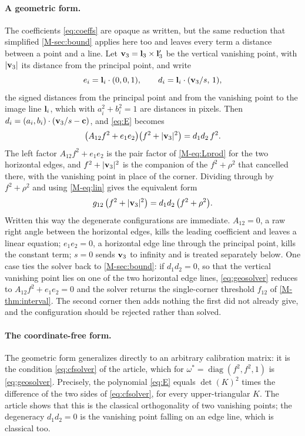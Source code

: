 \paragraph{A geometric form.} The coefficients \eqref{eq:coeffs} are opaque as written, but the same reduction that simplified \cref{M-sec:bound} applies here too and leaves every term a distance between a point and a line. Let $\mathbf{v}_3=\mathbf{l}_3\times\mathbf{l}_3'$ be the vertical vanishing point, with $|\mathbf{v}_3|$ its distance from the principal point, and write
\[
e_i=\mathbf{l}_i\cdot(0,0,1),\qquad d_i=\mathbf{l}_i\cdot(\mathbf{v}_3/s,\,1),
\]
the signed distances from the principal point and from the vanishing point to the image line $\mathbf{l}_i$, which with $a_i^2+b_i^2=1$ are distances in pixels. Then $d_i=(a_i,b_i)\cdot(\mathbf{v}_3/s-\mathbf{c})$, and \eqref{eq:E} becomes
\begin{equation}
\bigl(A_{12}f^2+e_1e_2\bigr)\bigl(f^2+|\mathbf{v}_3|^2\bigr)=d_1d_2\,f^2 .
\label{eq:geosolver}
\end{equation}
The left factor $A_{12}f^2+e_1e_2$ is the pair factor of \eqref{M-eq:Lprod} for the two horizontal edges, and $f^2+|\mathbf{v}_3|^2$ is the companion of the $f^2+\rho^2$ that cancelled there, with the vanishing point in place of the corner. Dividing through by $f^2+\rho^2$ and using \eqref{M-eq:lin} gives the equivalent form
\begin{equation}
g_{12}\,\bigl(f^2+|\mathbf{v}_3|^2\bigr)=d_1d_2\,\bigl(f^2+\rho^2\bigr).
\label{eq:geosolver2}
\end{equation}
Written this way the degenerate configurations are immediate. $A_{12}=0$, a raw right angle between the horizontal edges, kills the leading coefficient and leaves a linear equation; $e_1e_2=0$, a horizontal edge line through the principal point, kills the constant term; $s=0$ sends $\mathbf{v}_3$ to infinity and is treated separately below. One case ties the solver back to \cref{M-sec:bound}: if $d_1d_2=0$, so that the vertical vanishing point lies on one of the two horizontal edge lines, \eqref{eq:geosolver} reduces to $A_{12}f^2+e_1e_2=0$ and the solver returns the single-corner threshold $f_{12}$ of \cref{M-thm:interval}. The second corner then adds nothing the first did not already give, and the configuration should be rejected rather than solved.

\paragraph{The coordinate-free form.} The geometric form generalizes directly to an arbitrary calibration matrix: it is the condition \eqref{eq:cfsolver} of the article, which for $\omega^{*}=\operatorname{diag}(f^2,f^2,1)$ is \eqref{eq:geosolver}. Precisely, the polynomial \eqref{eq:E} equals $\det(K)^2$ times the difference of the two sides of \eqref{eq:cfsolver}, for every upper-triangular $K$. The article shows that this is the classical orthogonality of two vanishing points; the degeneracy $d_1d_2=0$ is the vanishing point falling on an edge line, which is classical too.

